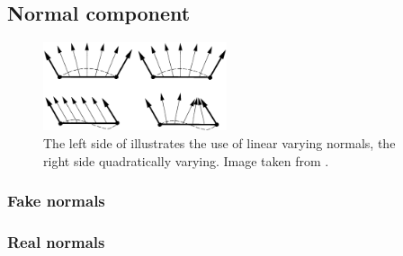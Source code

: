 
\subsection{Normal component}
\label{sss:method:normals}
\begin{figure}
	\centering
	\includegraphics[width=0.48\textwidth]{./content/img/method/lin_vs_quad_varying_normals(inspiration).png}
	\caption{The left side of illustrates the use of linear varying normals, the right side quadratically varying. Image taken from \citeauthor{van1997phong}\textcite{van1997phong}. }
	\label{fig:3:linear_vs_quadratic_varying_normals}
\end{figure}

\subsubsection{Fake normals}
\label{sss:method:normals:fakeNormals}

\subsubsection{Real normals}
\label{sss:method:normals:realNormals}
